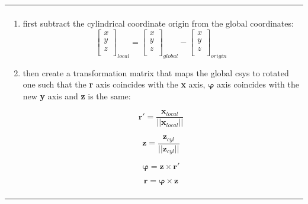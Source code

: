 \documentclass[10pt,b5paper,titlepage]{book}
\newcommand{\m}{\mathbf}
\newcommand{\M}{\pmb}
\newenvironment{bbox}[1][0.96]
{
    \begin{center}
        \begin{tabular}{|p{#1\textwidth}|}
            \hline\\
}
{
            \\\\\hline
        \end{tabular}
    \end{center}
}
\begin{document}
\begin{bbox}
    \begin{enumerate}
        \item first subtract the cylindrical coordinate origin from the global
            coordinates:
            \begin{equation}
                \begin{bmatrix}
                    x \\
                    y \\
                    z \\
                \end{bmatrix}_{local}
                = \begin{bmatrix}
                    x \\
                    y \\
                    z \\
                \end{bmatrix}_{global}
                - \begin{bmatrix}
                    x \\
                    y \\
                    z \\
                \end{bmatrix}_{origin}
            \end{equation}

        \item then create a transformation matrix that maps the global csys
            to rotated one such that the \textbf{r} axis coincides with the
            \textbf{x} axis, $ \M{\varphi} $ axis coincides with the new
            \textbf{y} axis and \textbf{z} is the same:

            \begin{equation}
                \m{r}' = \frac{\m{x}_{local}}{|| \m{x}_{local} ||}
            \end{equation}

            \begin{equation}
                \m{z} = \frac{\m{z}_{cyl}}{|| \m{z}_{cyl} ||}
            \end{equation}

            \begin{equation}
                \M{\varphi} = \m{z} \times \m{r}'
            \end{equation}

            \begin{equation}
                \m{r} = \M{\varphi} \times \m{z}
            \end{equation}


\end{enumerate}
\end{bbox}
\end{document}

